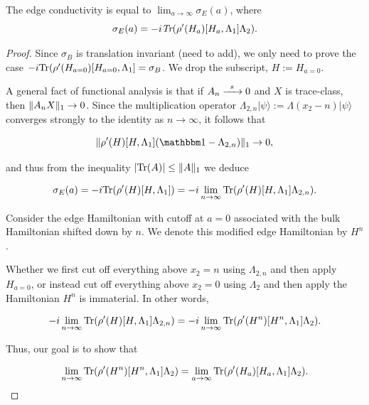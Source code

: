 \documentclass[12pt, letterpaper]{article}
\begin{document}
\begin{lemma}
The edge conductivity is equal to $\lim_{a\to\infty}\sigma_E(a)$, where
\[\sigma_E(a) = -i\emph{Tr}(\rho'(H_a)[H_a,\Lambda_1]\Lambda_2).\]
\label{lemma:edgeconductivitylimit}
\end{lemma}
\begin{proof}
Since $\sigma_B$ is translation invariant (need to add), we only need to prove the case $-i\text{Tr}(\rho'(H_{a=0})[H_{a=0},\Lambda_1] = \sigma_B$. We drop the subscript, $H := H_{a=0}$. 

A general fact of functional analysis is that if $A_n \xrightarrow{\enskip s \enskip} 0$ and $X$ is trace-class, then $\lVert A_nX \rVert_1 \to 0$. Since the multiplication operator $\Lambda_{2,n} |\psi\rangle := \Lambda(x_2-n) |\psi\rangle$ converges strongly to the identity as $n\to\infty$, it follows that

\[\norm{\rho'(H)[H,\Lambda_1](\One-\Lambda_{2,n})}_1 \to 0,\]

and thus from the inequality $|\text{Tr}(A)|\leq \lVert A \rVert_1$ we deduce

\[\sigma_E(a) = -i\text{Tr}(\rho'(H)[H,\Lambda_1]) = -i\lim_{n\to\infty}\text{Tr}(\rho'(H)[H,\Lambda_1]\Lambda_{2,n}).\]


Consider the edge Hamiltonian with cutoff at $a=0$ associated with the bulk Hamiltonian shifted down by $n$. We denote this modified edge Hamiltonian by $H^n$.

Whether we first cut off everything above $x_2=n$ using $\Lambda_{2,n}$ and then apply $H_{a=0}$, or instead cut off everything above $x_2=0$ using $\Lambda_2$ and then apply the Hamiltonian $H^n$ is immaterial. 
In other words,

\[-i\lim_{n\to\infty}\text{Tr}(\rho'(H)[H,\Lambda_1]\Lambda_{2,n}) = -i\lim_{n\to\infty}\text{Tr}(\rho'(H^n)[H^n,\Lambda_1]\Lambda_2).\]

Thus, our goal is to show that 

\[\lim_{n\to\infty}\text{Tr}(\rho'(H^n)[H^n,\Lambda_1]\Lambda_2) = \lim_{a\to\infty}\text{Tr}(\rho'(H_a)[H_a,\Lambda_1]\Lambda_2).\]
\end{proof}

\end{document}
